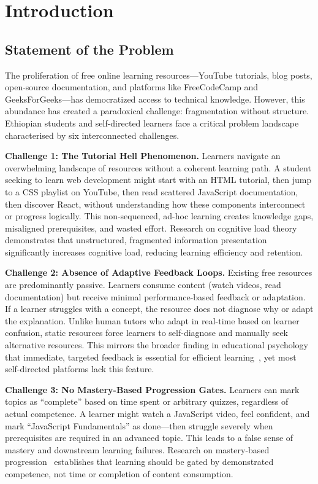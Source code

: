 \chapter{Introduction}

\section{Statement of the Problem}
\label{sec:statement-problem}

The proliferation of free online learning resources---YouTube tutorials, blog posts, open-source documentation, and platforms like FreeCodeCamp and GeeksForGeeks---has democratized access to technical knowledge. However, this abundance has created a paradoxical challenge: fragmentation without structure. Ethiopian students and self-directed learners face a critical problem landscape characterised by six interconnected challenges.

\textbf{Challenge 1: The Tutorial Hell Phenomenon.} Learners navigate an overwhelming landscape of resources without a coherent learning path. A student seeking to learn web development might start with an HTML tutorial, then jump to a CSS playlist on YouTube, then read scattered JavaScript documentation, then discover React, without understanding how these components interconnect or progress logically. This non-sequenced, ad-hoc learning creates knowledge gaps, misaligned prerequisites, and wasted effort. Research on cognitive load theory~\cite{sweller1988} demonstrates that unstructured, fragmented information presentation significantly increases cognitive load, reducing learning efficiency and retention.

\textbf{Challenge 2: Absence of Adaptive Feedback Loops.} Existing free resources are predominantly passive. Learners consume content (watch videos, read documentation) but receive minimal performance-based feedback or adaptation. If a learner struggles with a concept, the resource does not diagnose why or adapt the explanation. Unlike human tutors who adapt in real-time based on learner confusion, static resources force learners to self-diagnose and manually seek alternative resources. This mirrors the broader finding in educational psychology that immediate, targeted feedback is essential for efficient learning~\cite{hattie2007}, yet most self-directed platforms lack this feature.

\textbf{Challenge 3: No Mastery-Based Progression Gates.} Learners can mark topics as \enquote{complete} based on time spent or arbitrary quizzes, regardless of actual competence. A learner might watch a JavaScript video, feel confident, and mark \enquote{JavaScript Fundamentals} as done---then struggle severely when prerequisites are required in an advanced topic. This leads to a false sense of mastery and downstream learning failures. Research on mastery-based progression~\cite{bloom1968} establishes that learning should be gated by demonstrated competence, not time or completion of content consumption.

